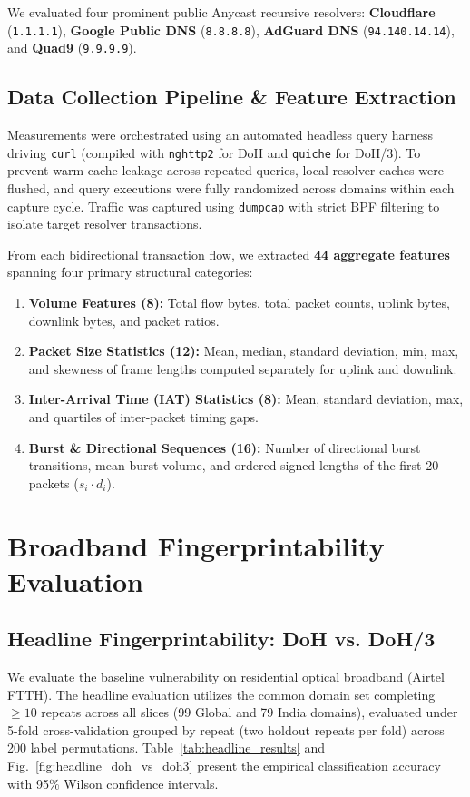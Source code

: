 \documentclass[conference,10pt]{IEEEtran}
\begin{document}
We evaluated four prominent public Anycast recursive resolvers: \textbf{Cloudflare} (\texttt{1.1.1.1}), \textbf{Google Public DNS} (\texttt{8.8.8.8}), \textbf{AdGuard DNS} (\texttt{94.140.14.14}), and \textbf{Quad9} (\texttt{9.9.9.9}).

\subsection{Data Collection Pipeline \& Feature Extraction}
Measurements were orchestrated using an automated headless query harness driving \texttt{curl} (compiled with \texttt{nghttp2} for DoH and \texttt{quiche} for DoH/3). To prevent warm-cache leakage across repeated queries, local resolver caches were flushed, and query executions were fully randomized across domains within each capture cycle. Traffic was captured using \texttt{dumpcap} with strict BPF filtering to isolate target resolver transactions.

From each bidirectional transaction flow, we extracted \textbf{44 aggregate features} spanning four primary structural categories:
\begin{enumerate}
    \item \textbf{Volume Features (8):} Total flow bytes, total packet counts, uplink bytes, downlink bytes, and packet ratios.
    \item \textbf{Packet Size Statistics (12):} Mean, median, standard deviation, min, max, and skewness of frame lengths computed separately for uplink and downlink.
    \item \textbf{Inter-Arrival Time (IAT) Statistics (8):} Mean, standard deviation, max, and quartiles of inter-packet timing gaps.
    \item \textbf{Burst \& Directional Sequences (16):} Number of directional burst transitions, mean burst volume, and ordered signed lengths of the first 20 packets ($s_i \cdot d_i$).
\end{enumerate}

\section{Broadband Fingerprintability Evaluation}
\label{sec:res_broadband}

\subsection{Headline Fingerprintability: DoH vs. DoH/3}
We evaluate the baseline vulnerability on residential optical broadband (Airtel FTTH). The headline evaluation utilizes the common domain set completing $\ge 10$ repeats across all slices (99 Global and 79 India domains), evaluated under 5-fold cross-validation grouped by repeat (two holdout repeats per fold) across 200 label permutations. Table~\ref{tab:headline_results} and Fig.~\ref{fig:headline_doh_vs_doh3} present the empirical classification accuracy with 95\% Wilson confidence intervals.
\end{document}
